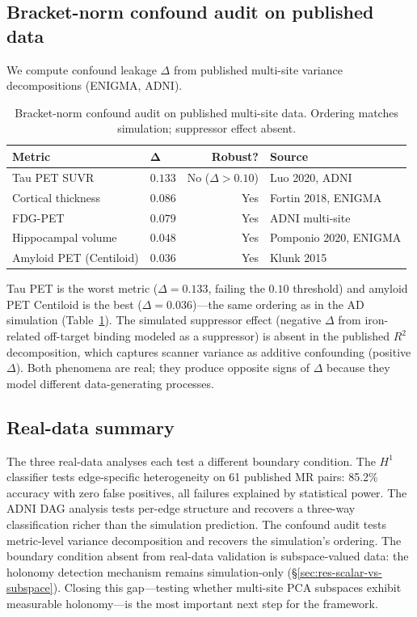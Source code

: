 \documentclass{article}
\begin{document}
\subsection{Bracket-norm confound audit on published data}
\label{sec:realdata-confound}

We compute confound leakage $\Delta$ from published multi-site variance decompositions (ENIGMA, ADNI).

\begin{table}[t]
\centering
\caption{Bracket-norm confound audit on published multi-site data. Ordering matches simulation; suppressor effect absent.}
\label{tab:realdata-confound}
\small
\begin{tabular}{@{}llrl@{}}
\toprule
\textbf{Metric} & $\boldsymbol{\Delta}$ & \textbf{Robust?} & \textbf{Source} \\
\midrule
Tau PET SUVR & $0.133$ & No ($\Delta > 0.10$) & Luo 2020, ADNI \\
Cortical thickness & $0.086$ & Yes & Fortin 2018, ENIGMA \\
FDG-PET & $0.079$ & Yes & ADNI multi-site \\
Hippocampal volume & $0.048$ & Yes & Pomponio 2020, ENIGMA \\
Amyloid PET (Centiloid) & $0.036$ & Yes & Klunk 2015 \\
\bottomrule
\end{tabular}
\end{table}

Tau PET is the worst metric ($\Delta = 0.133$, failing the $0.10$ threshold) and amyloid PET Centiloid is the best ($\Delta = 0.036$)---the same ordering as in the AD simulation (Table~\ref{tab:realdata-confound}). The simulated suppressor effect (negative $\Delta$ from iron-related off-target binding modeled as a suppressor) is absent in the published $R^2$ decomposition, which captures scanner variance as additive confounding (positive $\Delta$). Both phenomena are real; they produce opposite signs of $\Delta$ because they model different data-generating processes.

\subsection{Real-data summary}
\label{sec:realdata-summary}

The three real-data analyses each test a different boundary condition.
The $H^1$ classifier tests edge-specific heterogeneity on 61 published MR pairs: 85.2\% accuracy with zero false positives, all failures explained by statistical power.
The ADNI DAG analysis tests per-edge structure and recovers a three-way classification richer than the simulation prediction.
The confound audit tests metric-level variance decomposition and recovers the simulation's ordering.
The boundary condition absent from real-data validation is subspace-valued data: the holonomy detection mechanism remains simulation-only (\S\ref{sec:res-scalar-vs-subspace}).
Closing this gap---testing whether multi-site PCA subspaces exhibit measurable holonomy---is the most important next step for the framework.
\end{document}
